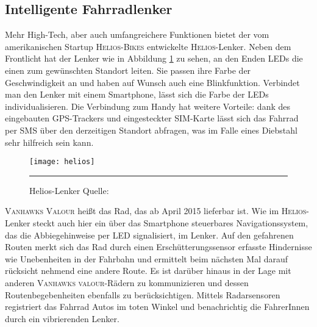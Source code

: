 \subsection{Intelligente Fahrradlenker}
Mehr High-Tech, aber auch umfangreichere Funktionen bietet der vom amerikanischen Startup \textsc{Helios-Bikes} entwickelte \textsc{Helios}-Lenker. Neben dem Frontlicht hat der Lenker wie in Abbildung \ref{fig:helios} zu sehen, an den Enden \glspl{LED} die einen zum gewünschten Standort leiten. Sie passen ihre Farbe der Geschwindigkeit an und haben auf Wunsch auch eine Blinkfunktion. Verbindet man den Lenker mit einem \gls{Smartphone}, lässt sich die Farbe der \glspl{LED} individualisieren. Die Verbindung zum Handy hat weitere Vorteile: dank des eingebauten \gls{GPS}-Trackers und eingesteckter SIM-Karte lässt sich das Fahrrad per SMS über den derzeitigen Standort abfragen\cite{Helios}, was im Falle eines Diebstahl sehr hilfreich sein kann. 
\begin{figure}[H]
    \centering
    \texttt{[image: helios]}
    \rule{35em}{0.5pt}
    \caption[Helios-Lenker]{Helios-Lenker  Quelle: \cite{Helios}} 		
    \label{fig:helios}
\end{figure}
\textsc{Vanhawks Valour} heißt das Rad, das ab April 2015 lieferbar ist. Wie im \textsc{Helios}-Lenker steckt auch hier ein über das \gls{Smartphone} steuerbares Navigationssystem, das die Abbiegehinweise per \gls{LED} signalisiert, im Lenker. Auf den gefahrenen Routen merkt sich das Rad durch einen Erschütterungssensor erfasste Hindernisse wie Unebenheiten in der Fahrbahn und ermittelt beim nächsten Mal darauf rücksicht nehmend eine andere Route. Es ist darüber hinaus in der Lage mit anderen \textsc{Vanhawks valour}-Rädern zu kommunizieren und dessen Routenbegebenheiten ebenfalls zu berücksichtigen. Mittels Radarsensoren registriert das Fahrrad Autos im toten Winkel und benachrichtig die FahrerInnen durch ein vibrierenden Lenker\cite{vanhawks}.
